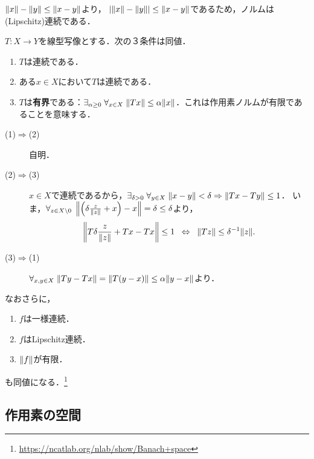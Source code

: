 \documentclass[uplatex,dvipdfmx]{jsreport}
\begin{document}
\begin{remark}
    $\|x\|-\|y\|\le\|x-y\|$より，
    $\lvert\|x\|-\|y\|\rvert\le\|x-y\|$であるため，ノルムは(Lipschitz)連続である．
\end{remark}

\begin{proposition}
    $T:X\to Y$を線型写像とする．次の３条件は同値．
    \begin{enumerate}
        \item $T$は連続である．
        \item ある$x\in X$において$T$は連続である．
        \item $T$は\textbf{有界}である：$\exists_{\alpha\ge 0}\;\forall_{x\in X}\;\|Tx\|\le\alpha\|x\|$．これは作用素ノルムが有限であることを意味する．
    \end{enumerate}
\end{proposition}
\begin{Proof}\mbox{}
    \begin{description}
        \item[(1)$\Rightarrow$(2)] 自明．
        \item[(2)$\Rightarrow$(3)] $x\in X$で連続であるから，$\exists_{\delta>0}\;\forall_{y\in X}\;\|x-y\|<\delta\Rightarrow\|Tx-Ty\|\le 1$．
        いま，$\forall_{z\in X\setminus 0}\;\left\|\left(\delta\frac{z}{\|z\|}+x\right)-x\right\|=\delta\le\delta$より，
        \[\left\|T\delta\frac{z}{\|z\|}+Tx-Tx\right\|\le 1\;\;\Leftrightarrow\;\;\|Tz\|\le\delta^{-1}\|z\|.\]
        \item[(3)$\Rightarrow$(1)]
        $\forall_{x,y\in X}\;\|Ty-Tx\|=\|T(y-x)\|\le\alpha\|y-x\|$より．
    \end{description}
\end{Proof}
\begin{remark}
    なおさらに，
    \begin{enumerate}
        \item $f$は一様連続．
        \item $f$はLipschitz連続．
        \item $\|f\|$が有限．
    \end{enumerate}
    も同値になる．\footnote{\url{https://ncatlab.org/nlab/show/Banach+space}}
\end{remark}

\subsection{作用素の空間}
\end{document}
